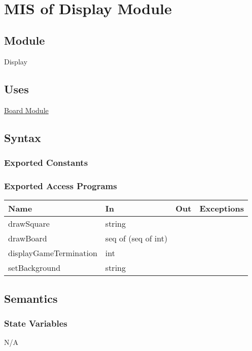 \documentclass[12pt, titlepage]{article}
\begin{document}
        ~\newpage
    

\section{MIS of Display Module} \label{mDisplay}

    \subsection{Module}
    Display

    \subsection{Uses}
    \hyperref[mBoard]{Board Module}

    \subsection{Syntax}
    \subsubsection{Exported Constants}

    \subsubsection{Exported Access Programs}
        \begin{center}
        \begin{tabular}{p{5cm} p{3.5cm} p{3cm} p{2.5cm}}
        \hline
        \textbf{Name} & \textbf{In} & \textbf{Out} & \textbf{Exceptions} \\
        \hline
        drawSquare & string & & \\
        \hline
        drawBoard & seq of (seq of int) & & \\
        \hline
        displayGameTermination & int & & \\
        \hline
        setBackground & string & & \\
        \hline
        \end{tabular}
        \end{center}

    \subsection{Semantics}
    \subsubsection{State Variables}
    N/A
\end{document}
